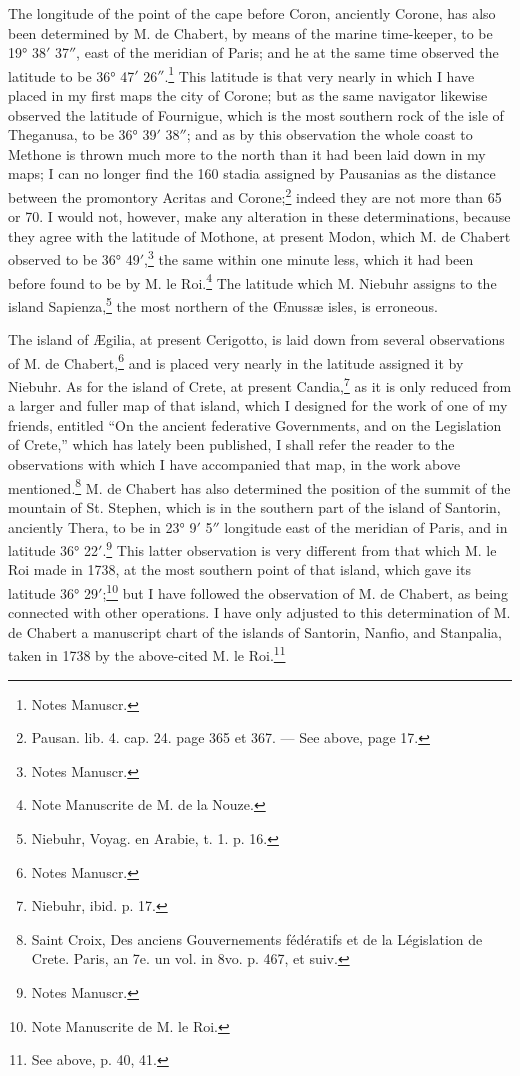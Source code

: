 \documentclass[a4paper, 11pt, oneside, polutonikogreek, english]{article}
\begin{document}
The longitude of the point of the cape before Coron, anciently Corone, has also been determined by M. de Chabert, by means of the marine time-keeper, to be 19° 38$'$ 37$''$, east of the meridian of Paris; and he at the same time observed the latitude to be 36° 47$'$ 26$''$.\footnote{Notes Manuscr.} This latitude is that very nearly in which I have placed in my first maps the city of Corone; but as the same navigator likewise observed the latitude of Fournigue, which is the most southern rock of the isle of Theganusa, to be 36° 39$'$ 38$''$; and as by this observation the whole coast to Methone is thrown much more to the north than it had been laid down in my maps; I can no longer find the 160 stadia assigned by Pausanias as the distance between the promontory Acritas and Corone;\footnote{Pausan. lib. 4. cap. 24. page 365 et 367. --- See above, page 17.} indeed they are not more than 65 or 70. I would not, however, make any alteration in these determinations, because they agree with the latitude of Mothone, at present Modon, which M. de Chabert observed to be 36° 49$'$,\footnote{Notes Manuscr.} the same within one minute less, which it had been before found to be by M. le Roi.\footnote{Note Manuscrite de M. de la Nouze.} The latitude which M. Niebuhr assigns to the island Sapienza,\footnote{Niebuhr, Voyag. en Arabie, t. 1. p. 16.} the most northern of the Œnussæ isles, is erroneous.

The island of Ægilia, at present Cerigotto, is laid down from several observations of M. de Chabert,\footnote{Notes Manuscr.} and is placed very nearly in the latitude assigned it by Niebuhr. As for the island of Crete, at present Candia,\footnote{Niebuhr, ibid. p. 17.} as it is only reduced from a larger and fuller map of that island, which I designed for the work of one of my friends, entitled ``On the ancient federative Governments, and on the Legislation of Crete,'' which has lately been published, I shall refer the reader to the observations with which I have accompanied that map, in the work above mentioned.\footnote{Saint Croix, Des anciens Gouvernements fédératifs et de la Législation de Crete. Paris, an 7e. un vol. in 8vo. p. 467, et suiv.} M. de Chabert has also determined the position of the summit of the mountain of St. Stephen, which is in the southern part of the island of Santorin, anciently Thera, to be in 23° 9$'$ 5$''$ longitude east of the meridian of Paris, and in latitude 36° 22$'$.\footnote{Notes Manuscr.} This latter observation is very different from that which M. le Roi made in 1738, at the most southern point of that island, which gave its latitude 36° 29$'$;\footnote{Note Manuscrite de M. le Roi.} but I have followed the observation of M. de Chabert, as being connected with other operations. I have only adjusted to this determination of M. de Chabert a manuscript chart of the islands of Santorin, Nanfio, and Stanpalia, taken in 1738 by the above-cited M. le Roi.\footnote{See above, p. 40, 41.}
\end{document}
